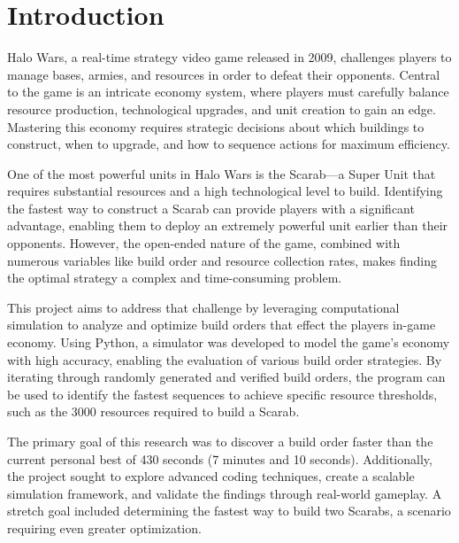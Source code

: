 \documentclass[a4paper, 12pt, english]{article}
\begin{document}
\newpage
\tableofcontents
\newpage

\section{Introduction}
Halo Wars, a real-time strategy video game released in 2009, challenges players to manage bases, armies, and resources in order to defeat their opponents. Central to the game is an intricate economy system, where players must carefully balance resource production, technological upgrades, and unit creation to gain an edge. Mastering this economy requires strategic decisions about which buildings to construct, when to upgrade, and how to sequence actions for maximum efficiency.
\newline

One of the most powerful units in Halo Wars is the Scarab—a Super Unit that requires substantial resources and a high technological level to build. Identifying the fastest way to construct a Scarab can provide players with a significant advantage, enabling them to deploy an extremely powerful unit earlier than their opponents. However, the open-ended nature of the game, combined with numerous variables like build order and resource collection rates, makes finding the optimal strategy a complex and time-consuming problem.
\newline

This project aims to address that challenge by leveraging computational simulation to analyze and optimize build orders that effect the players in-game economy. Using Python, a simulator was developed to model the game’s economy with high accuracy, enabling the evaluation of various build order strategies. By iterating through randomly generated and verified build orders, the program can be used to identify the fastest sequences to achieve specific resource thresholds, such as the 3000 resources required to build a Scarab.
\newline

The primary goal of this research was to discover a build order faster than the current personal best of 430 seconds (7 minutes and 10 seconds). Additionally, the project sought to explore advanced coding techniques, create a scalable simulation framework, and validate the findings through real-world gameplay. A stretch goal included determining the fastest way to build two Scarabs, a scenario requiring even greater optimization.
\newline
\end{document}
